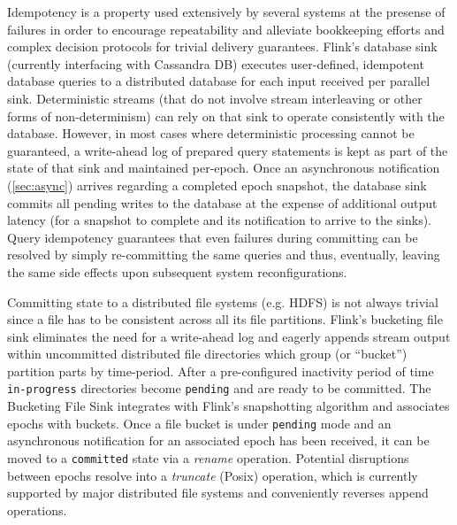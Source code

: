  Idempotency is a property used extensively by several systems at the presense of failures in order to encourage repeatability and alleviate bookkeeping efforts and complex decision protocols for trivial delivery guarantees\cite{CUSTOM:web/SparkStructuredStreaming,millwheel}. Flink's database sink (currently interfacing with Cassandra DB) executes user-defined, idempotent database queries to a distributed database for each input received per parallel sink. Deterministic streams (that do not involve stream interleaving or other forms of non-determinism) can rely on that sink to operate consistently with the database. However, in most cases where deterministic processing cannot be guaranteed, a write-ahead log of prepared query statements is kept as part of the state of that sink and maintained per-epoch. Once an asynchronous notification (\ref{sec:async}) arrives regarding a completed epoch snapshot, the database sink commits all pending writes to the database at the expense of additional output latency (for a snapshot to complete and its notification to arrive to the sinks). Query idempotency guarantees that even failures during committing can be resolved by simply re-committing the same queries and thus, eventually, leaving the same side effects upon subsequent system reconfigurations.

 Committing state to a distributed file systems (e.g. HDFS) is not always trivial since a file has to be consistent across all its file partitions. Flink's bucketing file sink eliminates the need for a write-ahead log and eagerly appends stream output within uncommitted distributed file directories which group (or ``bucket'') partition parts by time-period. After a pre-configured inactivity period of time \texttt{in-progress} directories become \texttt{pending} and are ready to be committed. The Bucketing File Sink integrates with Flink's snapshotting algorithm and associates epochs with buckets. Once a file bucket is under \texttt{pending} mode and an asynchronous notification for an associated epoch has been received, it can be moved to a \texttt{committed} state via a \emph{rename} operation. Potential disruptions between epochs resolve into a \emph{truncate} (Posix) operation, which is currently supported by major distributed file systems and conveniently reverses append operations. 


